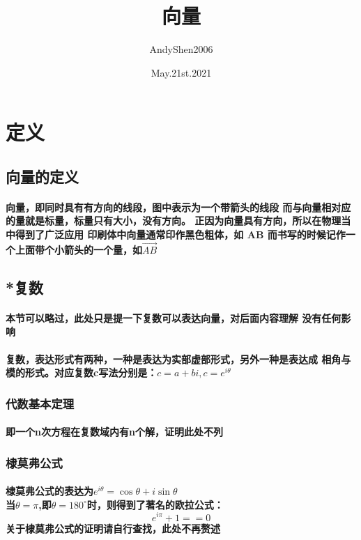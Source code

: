 \documentclass[final,11pt,oneside,UTF8]{article}
\author{AndyShen2006}
\date{May.21st.2021}
\title{向量}
\begin{document}
\maketitle
\section{定义}
\subsection{向量的定义}
\paragraph{
    向量，即同时具有有方向的线段，图中表示为一个带箭头的线段
    而与向量相对应的量就是标量，标量只有大小，没有方向。
    正因为向量具有方向，所以在物理当中得到了广泛应用
    印刷体中向量通常印作黑色粗体，如 $\textbf{AB} $
    而书写的时候记作一个上面带个小箭头的一个量，如$\vec{AB}$
}
\subsection{*复数}
\paragraph{
    本节可以略过，此处只是提一下复数可以表达向量，对后面内容理解
    没有任何影响
}
\paragraph{
复数，表达形式有两种，一种是表达为实部虚部形式，另外一种是表达成
相角与模的形式。对应复数c写法分别是：$c=a+bi, c=e^{i\theta}$
}
\subsubsection{代数基本定理}
\paragraph{
    即一个n次方程在复数域内有n个解，证明此处不列
}
\subsubsection{棣莫弗公式}
\paragraph{
棣莫弗公式的表达为$e^{i\theta}=\cos{\theta}+i\sin{\theta}$\\
当$\theta=\pi$,即$\theta=180^{\circ}$时，则得到了著名的欧拉公式：
$$e^{i\pi}+1==0$$
关于棣莫弗公式的证明请自行查找，此处不再赘述
}
\end{document}
